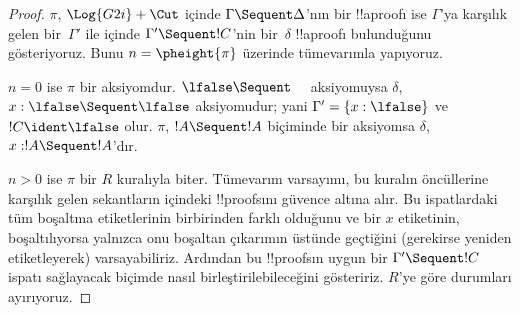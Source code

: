 \begin{proof}
  $\pi$, $\Log{G2i}+\Cut$ içinde $\Gamma \Sequent \Delta$'nın bir !!a{proof}{}ı
  ise $\Gamma$'ya karşılık gelen bir~$\Gamma'$ ile  içinde
  $\Gamma' \Sequent !C$'nin bir~$\delta$ !!a{proof}{}ı bulunduğunu gösteriyoruz.
  Bunu $n = \pheight{\pi}$ üzerinde tümevarımla yapıyoruz.

  $n = 0$ ise $\pi$ bir aksiyomdur. $\lfalse \Sequent \quad$ aksiyomuysa
  $\delta$, $x:\lfalse \Sequent \lfalse$ aksiyomudur; yani
  $\Gamma' = \{x:\lfalse\}$ ve $!C \ident \lfalse$ olur. $\pi$, $!A \Sequent
  !A$ biçiminde bir aksiyomsa $\delta$, $x: !A \Sequent !A$'dır.
  
  $n>0$ ise $\pi$ bir $R$ kuralıyla biter. Tümevarım varsayımı, bu kuralın
  öncüllerine karşılık gelen sekantların  içindeki !!{proof}s{}ını
  güvence altına alır. Bu ispatlardaki tüm boşaltma etiketlerinin birbirinden
  farklı olduğunu ve bir $x$ etiketinin, boşaltılıyorsa yalnızca onu boşaltan
  çıkarımın üstünde geçtiğini (gerekirse yeniden etiketleyerek) varsayabiliriz.
  Ardından bu !!{proof}s{}ın uygun bir $\Gamma' \Sequent !C$ ispatı sağlayacak
  biçimde nasıl birleştirilebileceğini gösteririz. $R$'ye göre durumları
  ayırıyoruz.


\end{proof}
